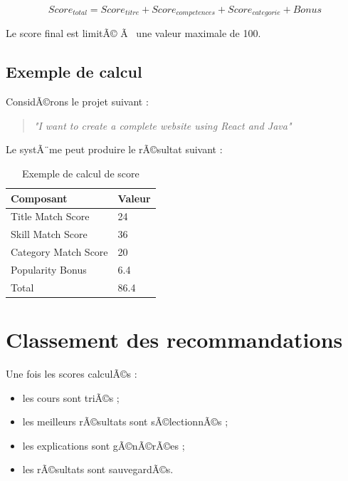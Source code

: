 ﻿\documentclass[12pt,a4paper]{report}
\begin{document}
\[
Score_{total} =
Score_{titre}
+
Score_{competences}
+
Score_{categorie}
+
Bonus
\]

Le score final est limitÃ© Ã  une valeur maximale de 100.

\subsection{Exemple de calcul}

ConsidÃ©rons le projet suivant :

\begin{quote}
\textit{
"I want to create a complete website using React and Java"
}
\end{quote}

Le systÃ¨me peut produire le rÃ©sultat suivant :

\begin{table}[H]
    \centering
    \caption{Exemple de calcul de score}

    \begin{tabular}{|p{5cm}|p{3cm}|}
        \hline
        \textbf{Composant} & \textbf{Valeur} \\
        \hline

        Title Match Score &
        24 \\
        
        \hline

        Skill Match Score &
        36 \\
        
        \hline

        Category Match Score &
        20 \\
        
        \hline

        Popularity Bonus &
        6.4 \\
        
        \hline

        Total &
        86.4 \\
        
        \hline
    \end{tabular}
\end{table}

\section{Classement des recommandations}

Une fois les scores calculÃ©s :
\begin{itemize}
    \item les cours sont triÃ©s ;
    \item les meilleurs rÃ©sultats sont sÃ©lectionnÃ©s ;
    \item les explications sont gÃ©nÃ©rÃ©es ;
    \item les rÃ©sultats sont sauvegardÃ©s.
\end{itemize}
\end{document}
